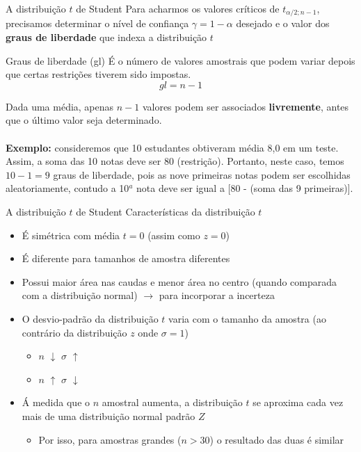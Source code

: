 \documentclass[10pt]{beamer}\usepackage[]{graphicx}\usepackage[]{color}
\theoremstyle{definition}
\begin{document}
\begin{frame}{A distribuição $t$ de Student}
  Para acharmos os valores críticos de $t_{\alpha/2;n-1}$, precisamos
  determinar o nível de confiança $\gamma = 1 - \alpha$ desejado e o
  valor dos \textbf{graus de liberdade} que indexa a distribuição $t$
  \begin{block}{Graus de liberdade (gl)}
    É o número de valores amostrais que podem variar depois que certas
    restrições tiverem sido impostas.
    \begin{equation*}
      gl = n-1
    \end{equation*}
  \end{block}
  Dada uma média, apenas $n-1$ valores podem ser associados
  \textbf{livremente}, antes que o último valor seja determinado.\\~\\
  \textbf{Exemplo:} consideremos que 10 estudantes obtiveram média 8,0
  em um teste. Assim, a soma das 10 notas deve ser 80
  (restrição). Portanto, neste caso, temos $10-1=9$ graus de liberdade,
  pois as nove primeiras notas podem ser escolhidas aleatoriamente,
  contudo a 10$^{a}$ nota deve ser igual a [80 - (soma das 9 primeiras)].
\end{frame}

\begin{frame}{A distribuição $t$ de Student}
  Características da distribuição $t$
  \begin{itemize}
  \item É simétrica com média $t=0$ (assim como $z=0$)
  \item É diferente para tamanhos de amostra diferentes
  \item Possui maior área nas caudas e menor área no centro (quando
    comparada com a distribuição normal) $\rightarrow$ para incorporar a
    incerteza
  \item O desvio-padrão da distribuição $t$ varia com o tamanho da
    amostra (ao contrário da distribuição $z$ onde $\sigma=1$)
    \begin{itemize}
    \item $n$ $\downarrow$ \quad $\sigma$ $\uparrow$
    \item $n$ $\uparrow$ \quad $\sigma$ $\downarrow$
    \end{itemize}
  \item Á medida que o $n$ amostral aumenta, a distribuição $t$ se
    aproxima cada vez mais de uma distribuição normal padrão $Z$
    \begin{itemize}
    \item Por isso, para amostras grandes ($n>30$) o resultado das duas
      é similar
    \end{itemize}
  \end{itemize}
\end{frame}
\end{document}
